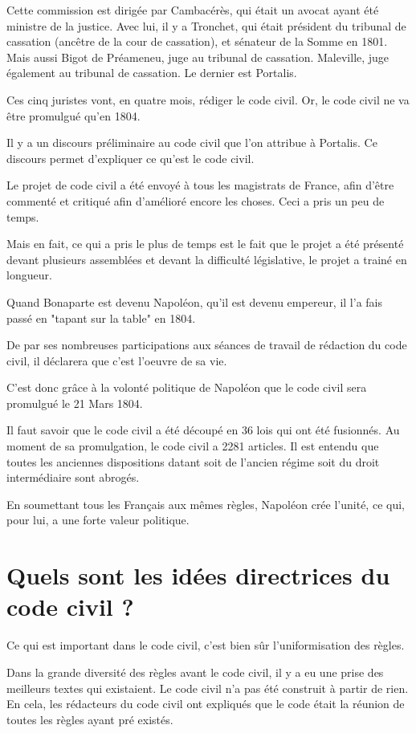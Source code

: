 \documentclass[12pt, a4paper, openany]{book}
\begin{document}
Cette commission est dirigée par Cambacérès, qui était un avocat ayant été ministre de la justice. Avec lui, il y a Tronchet, qui était président du tribunal de cassation (ancêtre de la cour de cassation), et sénateur de la Somme en 1801. Mais aussi Bigot de Préameneu, juge au tribunal de cassation. Maleville, juge également au tribunal de cassation. Le dernier est Portalis. 

Ces cinq juristes vont, en quatre mois, rédiger le code civil. Or, le code civil ne va être promulgué qu'en 1804.

Il y a un discours préliminaire au code civil que l'on attribue à Portalis. Ce discours permet d'expliquer ce qu'est le code civil.

Le projet de code civil a été envoyé à tous les magistrats de France, afin d'être commenté et critiqué afin d'amélioré encore les choses. Ceci a pris un peu de temps.

Mais en fait, ce qui a pris le plus de temps est le fait que le projet a été présenté devant plusieurs assemblées et devant la difficulté législative, le projet a trainé en longueur.

Quand Bonaparte est devenu Napoléon, qu'il est devenu empereur, il l'a fais passé en "tapant sur la table" en 1804.

De par ses nombreuses participations aux séances de travail de rédaction du code civil, il déclarera que c'est l'oeuvre de sa vie.

C'est donc grâce à la volonté politique de Napoléon que le code civil sera promulgué le 21 Mars 1804.

Il faut savoir que le code civil a été découpé en 36 lois qui ont été fusionnés. Au moment de sa promulgation, le code civil a 2281 articles. Il est entendu que toutes les anciennes dispositions datant soit de l'ancien régime soit du droit intermédiaire sont abrogés.

En soumettant tous les Français aux mêmes règles, Napoléon crée l'unité, ce qui, pour lui, a une forte valeur politique.

\section{Quels sont les idées directrices du code civil ?}

Ce qui est important dans le code civil, c'est bien sûr l'uniformisation des règles. 

Dans la grande diversité des règles avant le code civil, il y a eu une prise des meilleurs textes qui existaient. Le code civil n'a pas été construit à partir de rien. En cela, les rédacteurs du code civil ont expliqués que le code était la réunion de toutes les règles ayant pré existés.
\end{document}
